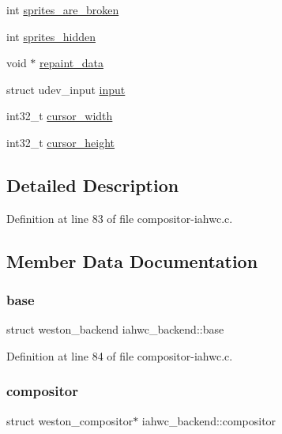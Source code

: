 \begin{DoxyCompactItemize}
\item 
int \mbox{\hyperlink{structiahwc__backend_ad046cdbf61ed56df228151a267a93f5d}{sprites\+\_\+are\+\_\+broken}}
\item 
int \mbox{\hyperlink{structiahwc__backend_ac14877b403d04d40e989df9ae9482722}{sprites\+\_\+hidden}}
\item 
void $\ast$ \mbox{\hyperlink{structiahwc__backend_af4bd6373d3284521062a544c9b95f412}{repaint\+\_\+data}}
\item 
struct udev\+\_\+input \mbox{\hyperlink{structiahwc__backend_a1155955cbc2d37d6034d7f51de2cdba5}{input}}
\item 
int32\+\_\+t \mbox{\hyperlink{structiahwc__backend_a34129c63afc03d555d69bec8c60e6a5a}{cursor\+\_\+width}}
\item 
int32\+\_\+t \mbox{\hyperlink{structiahwc__backend_ac205deb5c98e8d2b25f7455948df5899}{cursor\+\_\+height}}
\end{DoxyCompactItemize}


\subsection{Detailed Description}


Definition at line 83 of file compositor-\/iahwc.\+c.



\subsection{Member Data Documentation}
\mbox{\label{structiahwc__backend_ae18b2807a275166da755b8d581fed9df}} 
\subsubsection{\texorpdfstring{base}{base}}
{\footnotesize\ttfamily struct weston\+\_\+backend iahwc\+\_\+backend\+::base}



Definition at line 84 of file compositor-\/iahwc.\+c.

\mbox{\label{structiahwc__backend_aff09ba1b906f8c90ab72d6ea9e2604d1}} 
\subsubsection{\texorpdfstring{compositor}{compositor}}
{\footnotesize\ttfamily struct weston\+\_\+compositor$\ast$ iahwc\+\_\+backend\+::compositor}



